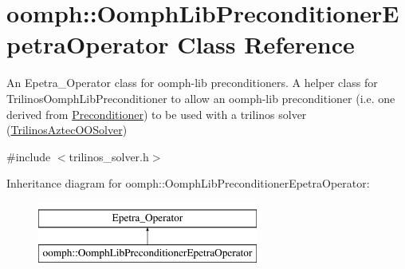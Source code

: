 \hypertarget{classoomph_1_1OomphLibPreconditionerEpetraOperator}{}\section{oomph\+:\+:Oomph\+Lib\+Preconditioner\+Epetra\+Operator Class Reference}
\label{classoomph_1_1OomphLibPreconditionerEpetraOperator}


An Epetra\+\_\+\+Operator class for oomph-\/lib preconditioners. A helper class for Trilinos\+Oomph\+Lib\+Preconditioner to allow an oomph-\/lib preconditioner (i.\+e. one derived from \hyperlink{classoomph_1_1Preconditioner}{Preconditioner}) to be used with a trilinos solver (\hyperlink{classoomph_1_1TrilinosAztecOOSolver}{Trilinos\+Aztec\+O\+O\+Solver})  




{\ttfamily \#include $<$trilinos\+\_\+solver.\+h$>$}

Inheritance diagram for oomph\+:\+:Oomph\+Lib\+Preconditioner\+Epetra\+Operator\+:\begin{figure}[H]
\begin{center}
\leavevmode
\includegraphics[height=2.000000cm]{classoomph_1_1OomphLibPreconditionerEpetraOperator}
\end{center}
\end{figure}
